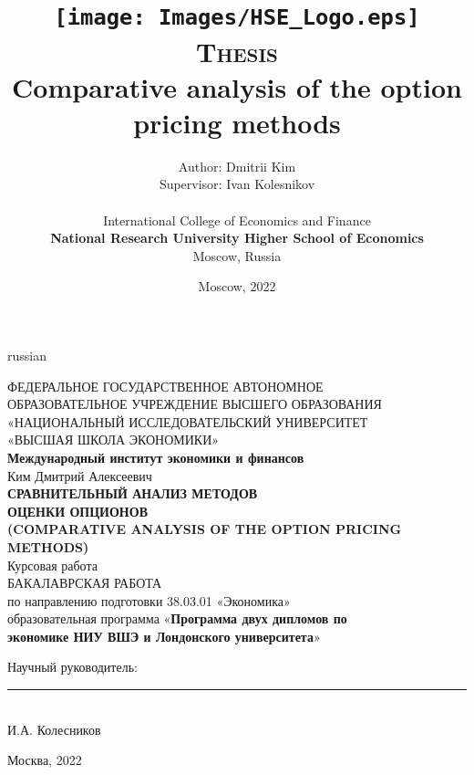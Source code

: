 \documentclass[11pt]{article}
\title{
\vspace{-1cm}
\texttt{[image: Images/HSE\_Logo.eps]}\\
\vspace{2cm}
\normalsize{\textsc{Thesis}}\\ \vspace{0.5cm}
\LARGE{\textbf{Comparative analysis of the option pricing methods}}
\vspace{3.5cm}}
\author{
\large{Author}: \Large{Dmitrii Kim}\\
\large{Supervisor}: \Large{Ivan Kolesnikov}\\
		\vspace{3.0cm} \\
		International College of Economics and Finance\\
  \textbf{National Research University Higher School of Economics}\\
  Moscow, Russia
  \vspace{0.8cm}
  } \date{Moscow, 2022}
\begin{document}
\thispagestyle{plain}
\begin{otherlanguage*}{russian}
\begin{center}
\Large{ФЕДЕРАЛЬНОЕ ГОСУДАРСТВЕННОЕ АВТОНОМНОЕ \\
ОБРАЗОВАТЕЛЬНОЕ УЧРЕЖДЕНИЕ ВЫСШЕГО ОБРАЗОВАНИЯ \\
«НАЦИОНАЛЬНЫЙ ИССЛЕДОВАТЕЛЬСКИЙ УНИВЕРСИТЕТ \\
«ВЫСШАЯ ШКОЛА ЭКОНОМИКИ»}\\
\vspace{0.3cm}
\Large{\textbf{Международный институт экономики и финансов}}\\
\vspace{0.7cm}
\Large{Ким Дмитрий Алексеевич\\}
\vspace{0.3cm}
\textbf{СРАВНИТЕЛЬНЫЙ АНАЛИЗ МЕТОДОВ\\ ОЦЕНКИ ОПЦИОНОВ\\
\vspace{7pt}
\large{(COMPARATIVE ANALYSIS OF THE OPTION PRICING METHODS)}}\\
\vspace{0.2cm}
Курсовая работа\\
\vspace{3pt}
БАКАЛАВРСКАЯ РАБОТА\\
\vspace{3pt}
по направлению подготовки 38.03.01 «Экономика»\\
\vspace{3pt}
образовательная программа «\textbf{Программа двух дипломов по \\ экономике НИУ ВШЭ и Лондонского университета}»
\vspace{1.5cm}

\begin{flushright}
\large{Научный руководитель:\\
\noindent\rule{4.5cm}{0.4pt}\\
И.А. Колесников\\}
\end{flushright}

\vfill
Москва, 2022
\end{center}
\end{otherlanguage*}


\newpage
\thispagestyle{plain}
\tableofcontents
\newpage
\end{document}
